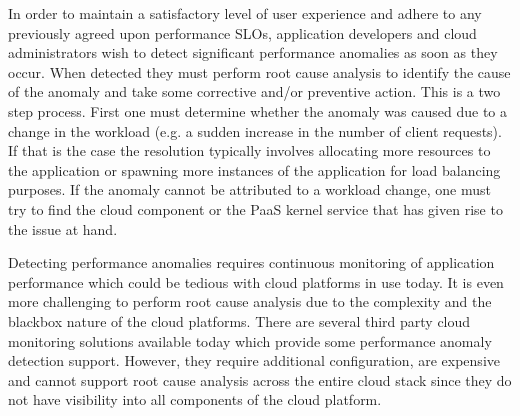 In order to maintain a satisfactory level of user experience and adhere to any previously
agreed upon performance SLOs, application developers and cloud administrators wish
to detect significant performance anomalies as soon as they occur. When detected they
must perform root cause analysis to identify the cause of the anomaly and take some
corrective and/or preventive action. This is a two step process. First one must determine
whether the anomaly was caused due to a change in the workload (e.g. a sudden 
increase in the number of client requests). If that is the case
the resolution typically involves allocating more resources to the application or spawning
more instances of the application for load balancing purposes. If the anomaly cannot be 
attributed to a workload change, one must try to find the cloud component or the PaaS kernel
service that has given rise to the issue at hand.

Detecting performance anomalies
requires continuous monitoring of application performance which could be tedious with
cloud platforms in use today. It is even more challenging to perform root cause analysis
due to the complexity and the blackbox nature of the cloud platforms. There are several
third party cloud monitoring solutions available today which provide some performance
anomaly detection support. However, they require additional configuration, are expensive
and cannot support root cause analysis across the entire cloud stack since they do not
have visibility into all components of the cloud platform.
